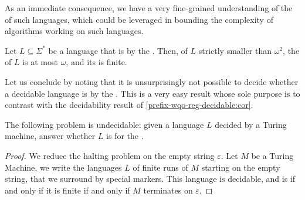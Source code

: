 As an immediate consequence, we have a very fine-grained understanding of the
 of such  languages, which could be
leveraged in bounding the complexity of algorithms working on such languages.

\begin{corollary}
    \label{prefixes-ordinal-invariants:cor}
    Let $L \subseteq \Sigma^*$ be a language that is
     by the . Then,
     of $L$ strictly smaller than $\omega^2$,
    the  of $L$ is at most $\omega$, and
    its  is finite.
\end{corollary}

Let us conclude by noting that it is unsurprisingly not possible to decide
whether a decidable language is  by the . This is a very easy result whose sole purpose is to contrast with
the decidability result of \cref{prefix-wqo-reg-decidable:cor}.

\begin{lemma}
    The following problem is undecidable: given a language $L$
    decided by a Turing machine, answer whether 
    $L$ is  for the .
\end{lemma}
\begin{proof}
    We reduce the halting problem on the empty string $\varepsilon$.
    Let $M$ be a Turing Machine, we write the languages $L$ of finite runs
    of $M$ starting on the empty string,
    that we surround by special markers. This language is decidable,
    and 
    is
     if and only if it is finite
    if and only if $M$ terminates on $\varepsilon$.
\end{proof}
